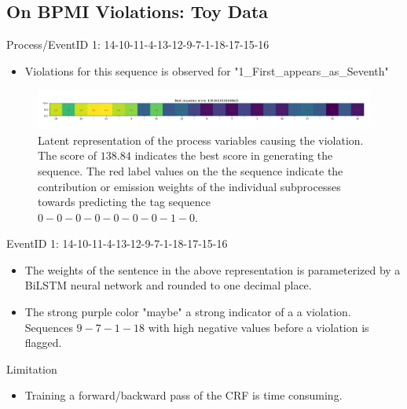 \documentclass{beamer}
\begin{document}
\subsection{On BPMI Violations: Toy Data}
\begin{frame} %
\begin{block}{Process/EventID 1: 14-10-11-4-13-12-9-7-1-18-17-15-16}
		\begin{itemize}
                \scriptsize
				\item Violations for this sequence is observed for "1\_First\_appears\_as\_Seventh"
			\end{itemize}
\end{block}
\begin{figure}[!h]
            \includegraphics[scale = .23]{item_zero.png}
            \centering
            \caption{\scriptsize Latent representation of the process variables causing the violation. The score of $138.84$ indicates the best score in generating the sequence. The red label values on the the sequence indicate the contribution or emission weights of the individual subprocesses towards predicting the tag sequence $0-0-0-0-0-0-0-1-0$.}
            \label{fig1}
\end{figure}
\begin{block}{EventID 1: 14-10-11-4-13-12-9-7-1-18-17-15-16}
		\begin{itemize}
            \scriptsize
			\item The weights of the sentence in the above representation is parameterized by a BiLSTM neural network and rounded to one decimal place.
            \item The strong purple color "maybe" a strong indicator of a a violation. Sequences $9-7-1-18$ with high negative values before a violation is flagged.
			\end{itemize}
\end{block}
\begin{alertblock}{Limitation}
		\begin{itemize}
            \scriptsize
			\item Training a forward/backward pass of the CRF is time consuming.
			\end{itemize}
\end{alertblock}
\end{frame}
\end{document}
